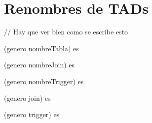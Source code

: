 \section{Renombres de TADs}

// Hay que ver bien como se escribe esto

 (genero nombreTabla) es 

 (genero nombreJoin) es 

 (genero nombreTrigger) es 

 (genero join) es 

 (genero trigger) es 

